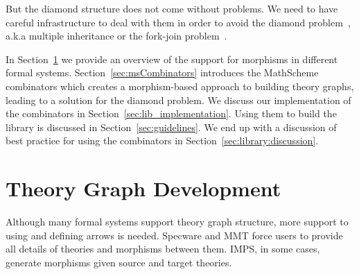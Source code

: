 But the diamond structure does not come without problems. We need to have careful infrastructure to deal with them in order to avoid the diamond problem~\cite{jigsaw1992,traits2006,diamonds2011}, a.k.a multiple inheritance or the fork-join problem~\cite{sakkinen1989disciplined}. 

In Section~\ref{sec:thry_graph_in_action} we provide an overview of the support for morphisms in different formal systems. Section~\ref{sec:msCombinators} introduces the MathScheme combinators which creates a morphism-based approach to building theory graphs, leading to a solution for the diamond problem. We discuss our implementation of the combinators in Section~\ref{sec:lib_implementation}. Using them to build the library is discussed in Section~\ref{sec:guidelines}. We end up with a discussion of best practice for using the combinators in Section~\ref{sec:library:discussion}. 

\begin{comment}
To test our generation algorithms, we needed a large library of equational theories. As we have discussed in Section~\ref{sec:broader_context}, we work in the favor of a library organized as a theory graph, believing that it leverages the structure of mathematical knowledge. Arrows of the graph are the means to relating the different theories. In this section, we present our approach to building a library that emphasizes these connections. 

In Section~\ref{sec:thry_based_libs} we discuss the motivation behind building such a library. In Section~\ref{sec:ms_combinators} we present the combinators used in building it and discuss how they are arrow based. Section~\ref{sec:lib_implementation}, discusses the challenges of the implementation of the combinators to build a theory graph. We finally show some interesting cases of library definitions in Section~\ref{sec:interesting_cases}. 
\end{comment}


\section{Theory Graph Development}
\label{sec:thry_graph_in_action}

Although many formal systems support theory graph structure, more support to using and defining arrows is needed. 
Specware and MMT force users to provide all details of theories and morphisms between them. IMPS, in some cases, generate morphisms given source and target theories. 

